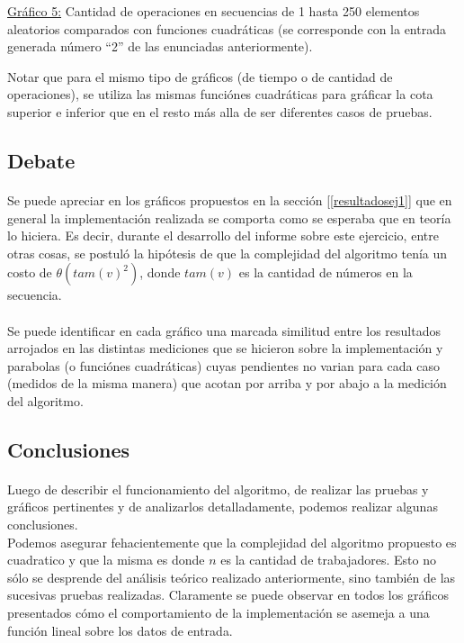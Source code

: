 \underline{Gráfico 5:} Cantidad de operaciones en secuencias de 1 hasta 250 elementos aleatorios comparados con funciones cuadráticas (se corresponde con la entrada generada número ``2'' de las enunciadas anteriormente).



Notar que para el mismo tipo de gráficos (de tiempo o de cantidad de operaciones), se utiliza las mismas funciónes cuadráticas para gráficar la cota superior e inferior que en el resto más alla de ser diferentes casos de pruebas. 




\subsection{Debate}
\paragraph{}
Se puede apreciar en los gráficos propuestos en la sección [\ref{resultadosej1}] que en general la implementación realizada se comporta como se esperaba que en teoría lo hiciera. Es decir, durante el desarrollo del informe sobre este ejercicio, entre otras cosas, se postuló la hipótesis de que la complejidad del algoritmo tenía un costo de $\theta(tam(v)^2)$, donde $tam(v)$ es la cantidad de números en la secuencia.

\paragraph{}
Se puede identificar en cada gráfico una marcada similitud entre los resultados arrojados en las distintas mediciones que se hicieron sobre la implementación y parabolas (o funciónes cuadráticas) cuyas pendientes no varian para cada caso (medidos de la misma manera) que acotan por arriba y por abajo a la medición del algoritmo.


\paragraph{}


\subsection{Conclusiones}
\paragraph{}
Luego de describir el funcionamiento del algoritmo, de realizar las pruebas y gráficos pertinentes y de analizarlos detalladamente, podemos realizar algunas conclusiones.\\
Podemos asegurar fehacientemente que la complejidad del algoritmo propuesto es cuadratico y que la misma es  donde $n$ es la cantidad de trabajadores. Esto no sólo se desprende del análisis teórico realizado anteriormente, sino también de las sucesivas pruebas realizadas. Claramente se puede observar en todos los gráficos presentados cómo el comportamiento de la implementación se asemeja a una función lineal sobre los datos de entrada.

